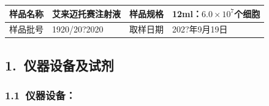 \documentclass[UTF8,10pt,a4paper,fontset=fandol]{ctexart}
\newcommand{\fieldvalue}[1]{#1}
\newcommand{\handwritten}[1]{#1}
\begin{document}
\begin{tabular}{|p{3.2cm}|p{5.0cm}|p{2.2cm}|p{4.0cm}|}
\hline
样品名称 & 艾来迈托赛注射液 & 样品规格 & 12ml：$6.0\times10^7$个细胞\\
\hline
样品批号 &
\fieldvalue{\handwritten{1920/20?2020}} &
取样日期 &
\fieldvalue{\handwritten{202?年9月19日}}\\
\hline
\end{tabular}

\subsection*{1.\ 仪器设备及试剂}

\subsubsection*{1.1\ 仪器设备：}
\end{document}
